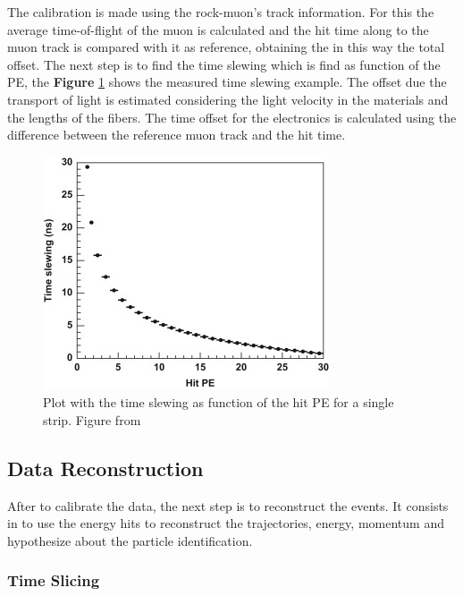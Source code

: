 \begin{itemize}
    The calibration is made using the rock-muon's track information. For this the average time-of-flight of the muon is calculated and the hit time along to the muon track is compared with it as reference, obtaining the in this way the total offset. The next step is to find the time slewing which is find as function of the PE, the \textbf{Figure} \ref{fig:MnvExp:MnvDetector:Calibration:InSitu:SlewingFunc} shows the measured time slewing example. The offset due the transport of light is estimated considering the light velocity in the materials and the lengths of the fibers. The time offset for the electronics is calculated using the difference between the reference muon track and the hit time.  
    \begin{figure}
        \centering
        \includegraphics{Figures/Chapter2/SlewingFunction.jpg}
        \caption{Plot with the time slewing as function of the hit PE for a single strip. Figure from \cite{MINERvA}}
        \label{fig:MnvExp:MnvDetector:Calibration:InSitu:SlewingFunc}
    \end{figure}
\end{itemize}

\pagebreak


\subsection{Data Reconstruction}
\label{Cap:MnvExp:MnvDetector:DataReconstruction}

After to calibrate the data, the next step is to reconstruct the events. It consists in to use the energy hits to reconstruct the trajectories, energy, momentum and hypothesize about the particle identification. 

\subsubsection{Time Slicing}
\label{Cap:MnvExp:MnvDetector:DataReconstruction:TimeSlicing}

